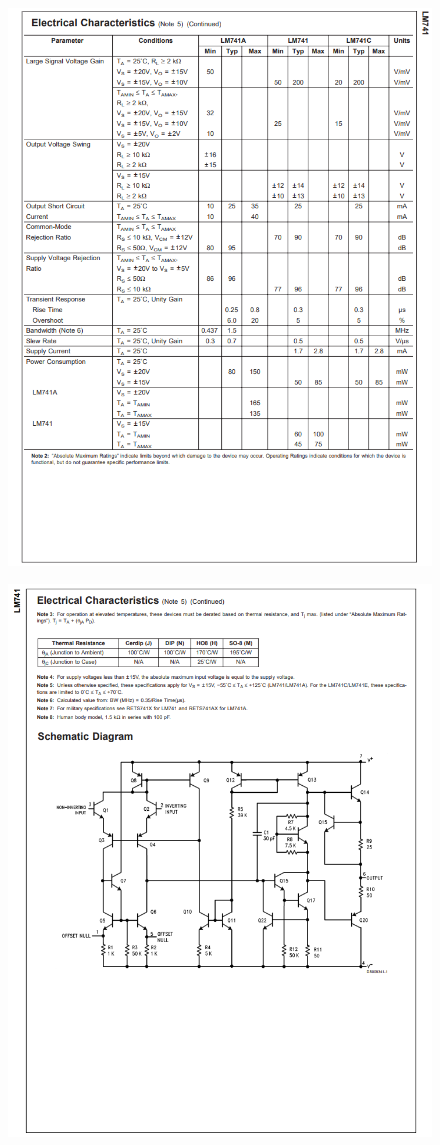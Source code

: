 \begin{figure}[h]
    \centering
    \includegraphics[width=0.9\linewidth]{Appendices/LM741_3.png}
    \label{LM741_3}
\end{figure}
\begin{figure}[h]
    \centering
    \includegraphics[width=0.9\linewidth]{Appendices/LM741_4.png}
    \label{LM741_4}
\end{figure}
\FloatBarrier
